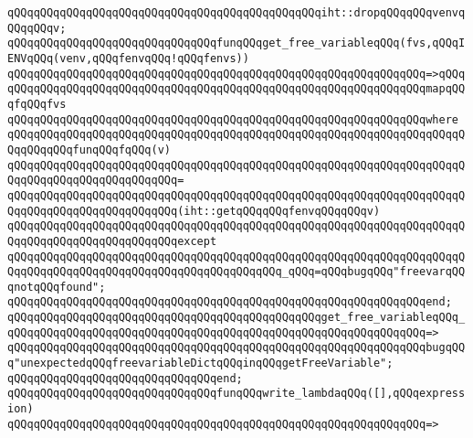 \verb|qQQqqQQqqQQqqQQqqQQqqQQqqQQqqQQqqQQqqQQqqQQqqQQqiht::dropqQQqqQQqvenvqQQqqQQqv;|\newline
\newline
\verb|qQQqqQQqqQQqqQQqqQQqqQQqqQQqqQQqfunqQQqget_free_variableqQQq(fvs,qQQqIENVqQQq(venv,qQQqfenvqQQq!qQQqfenvs))|\newline
\verb|qQQqqQQqqQQqqQQqqQQqqQQqqQQqqQQqqQQqqQQqqQQqqQQqqQQqqQQqqQQqqQQq=>qQQq|\newline
\verb|qQQqqQQqqQQqqQQqqQQqqQQqqQQqqQQqqQQqqQQqqQQqqQQqqQQqqQQqqQQqqQQqmapqQQqfqQQqfvs|\newline
\verb|qQQqqQQqqQQqqQQqqQQqqQQqqQQqqQQqqQQqqQQqqQQqqQQqqQQqqQQqqQQqqQQqwhere|\newline
\verb|qQQqqQQqqQQqqQQqqQQqqQQqqQQqqQQqqQQqqQQqqQQqqQQqqQQqqQQqqQQqqQQqqQQqqQQqqQQqqQQqfunqQQqfqQQq(v)|\newline
\verb|qQQqqQQqqQQqqQQqqQQqqQQqqQQqqQQqqQQqqQQqqQQqqQQqqQQqqQQqqQQqqQQqqQQqqQQqqQQqqQQqqQQqqQQqqQQqqQQq=|\newline
\verb|qQQqqQQqqQQqqQQqqQQqqQQqqQQqqQQqqQQqqQQqqQQqqQQqqQQqqQQqqQQqqQQqqQQqqQQqqQQqqQQqqQQqqQQqqQQqqQQq(iht::getqQQqqQQqfenvqQQqqQQqv)|\newline
\verb|qQQqqQQqqQQqqQQqqQQqqQQqqQQqqQQqqQQqqQQqqQQqqQQqqQQqqQQqqQQqqQQqqQQqqQQqqQQqqQQqqQQqqQQqqQQqqQQqexcept|\newline
\verb|qQQqqQQqqQQqqQQqqQQqqQQqqQQqqQQqqQQqqQQqqQQqqQQqqQQqqQQqqQQqqQQqqQQqqQQqqQQqqQQqqQQqqQQqqQQqqQQqqQQqqQQqqQQqqQQq_qQQq=qQQqbugqQQq"freevarqQQqnotqQQqfound";|\newline
\verb|qQQqqQQqqQQqqQQqqQQqqQQqqQQqqQQqqQQqqQQqqQQqqQQqqQQqqQQqqQQqqQQqend;|\newline
\newline
\verb|qQQqqQQqqQQqqQQqqQQqqQQqqQQqqQQqqQQqqQQqqQQqqQQqget_free_variableqQQq_|\newline
\verb|qQQqqQQqqQQqqQQqqQQqqQQqqQQqqQQqqQQqqQQqqQQqqQQqqQQqqQQqqQQqqQQq=>|\newline
\verb|qQQqqQQqqQQqqQQqqQQqqQQqqQQqqQQqqQQqqQQqqQQqqQQqqQQqqQQqqQQqqQQqbugqQQq"unexpectedqQQqfreevariableDictqQQqinqQQqgetFreeVariable";|\newline
\verb|qQQqqQQqqQQqqQQqqQQqqQQqqQQqqQQqend;|\newline
\newline
\newline
\verb|qQQqqQQqqQQqqQQqqQQqqQQqqQQqqQQqfunqQQqwrite_lambdaqQQq([],qQQqexpression)|\newline
\verb|qQQqqQQqqQQqqQQqqQQqqQQqqQQqqQQqqQQqqQQqqQQqqQQqqQQqqQQqqQQqqQQq=>|\newline
